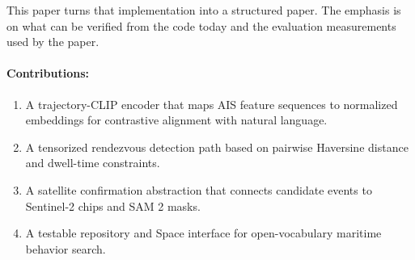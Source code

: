 \documentclass{article}
\begin{document}
This paper turns that implementation into a structured paper. The emphasis is on what can be verified from the code today and the evaluation measurements used by the paper.

\paragraph{Contributions:}
\begin{enumerate}
  \item A trajectory-CLIP encoder that maps AIS feature sequences to normalized embeddings for contrastive alignment with natural language.
  \item A tensorized rendezvous detection path based on pairwise Haversine distance and dwell-time constraints.
  \item A satellite confirmation abstraction that connects candidate events to Sentinel-2 chips and SAM 2 masks.
  \item A testable repository and Space interface for open-vocabulary maritime behavior search.
\end{enumerate}
\end{document}

